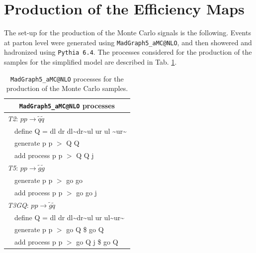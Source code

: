 \documentclass[a4paper,11pt]{article}
\newcommand{\TGQ}{ \textit{T3GQ}}
\newcommand{\Ttwo}{ \textit{T2}}
\newcommand{\Tfive}{ \textit{T5}}
\begin{document}
\section{Production of the Efficiency Maps}\label{EMprod}
The set-up for the production of the Monte Carlo signals is the following. Events at parton level were generated using \texttt{MadGraph5\_aMC@NLO}\cite{Alwall:2011uj}, and then showered and hadronized using \texttt{Pythia 6.4}\cite{Sjostrand:2006za}. The processes considered for the production of the samples for the simplified model are described in Tab. \ref{mg5_processes}.


\begin{table}
	\small
	\begin{center}
		\renewcommand{\arraystretch}{1.0}
		\begin{tabular}{ l l }  \toprule  \toprule 
			\multicolumn{2}{c}{\texttt{MadGraph5\_aMC@NLO} processes} \\ \toprule \toprule
			\multicolumn{2}{l}{\Ttwo: $p p \rightarrow \tilde q \tilde q$}  \\
			& define Q = dl dr dl\textasciitilde dr\textasciitilde ul ur ul \textasciitilde ur\textasciitilde \\
			& generate p p $>$ Q Q  \\
			&  add process p p $>$ Q Q j \\  \toprule 
			\multicolumn{2}{l}{\Tfive: $p p \rightarrow \tilde g \tilde g$ } \\ 
			& generate p p $>$ go go \\
			&  add process p p $>$ go go j \\ \toprule 
			\multicolumn{2}{l}{\TGQ: $p p \rightarrow \tilde g \tilde q$} \\  
			&  define Q = dl dr dl\textasciitilde dr\textasciitilde ul ur ul\textasciitilde ur\textasciitilde \\
			&  generate p p $>$ go Q \$ go Q \\
			&  add process p p $>$ go Q j \$ go Q \\  \bottomrule \bottomrule 
		\end{tabular}
	\end{center}
	\normalsize
	\caption{\texttt{MadGraph5\_aMC@NLO} processes for the production of the Monte Carlo samples.}
	\label{mg5_processes}

\end{table}
\end{document}
